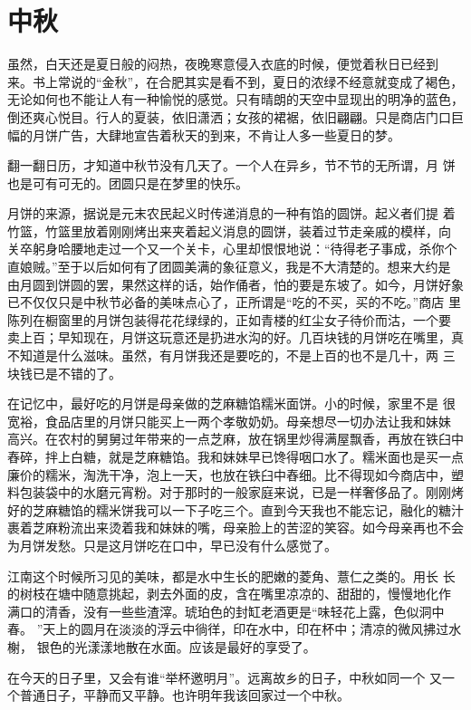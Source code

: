 \section{中秋}

虽然，白天还是夏日般的闷热，夜晚寒意侵入衣底的时候，便觉着秋日已经到 
来。书上常说的“金秋”，在合肥其实是看不到，夏日的浓绿不经意就变成了褐色， 
无论如何也不能让人有一种愉悦的感觉。只有晴朗的天空中显现出的明净的蓝色， 
倒还爽心悦目。行人的夏装，依旧潇洒；女孩的裙裾，依旧翩翩。只是商店门口巨 
幅的月饼广告，大肆地宣告着秋天的到来，不肯让人多一些夏日的梦。 

翻一翻日历，才知道中秋节没有几天了。一个人在异乡，节不节的无所谓，月 
饼也是可有可无的。团圆只是在梦里的快乐。 

月饼的来源，据说是元末农民起义时传递消息的一种有馅的圆饼。起义者们提 
着竹篮，竹篮里放着刚刚烤出来夹着起义消息的圆饼，装着过节走亲戚的模样，向 
关卒躬身哈腰地走过一个又一个关卡，心里却恨恨地说：“待得老子事成，杀你个 
直娘贼。”至于以后如何有了团圆美满的象征意义，我是不大清楚的。想来大约是 
由月圆到饼圆的罢，果然这样的话，始作俑者，怕的要是东坡了。如今，月饼好象 
已不仅仅只是中秋节必备的美味点心了，正所谓是“吃的不买，买的不吃。”商店 
里陈列在橱窗里的月饼包装得花花绿绿的，正如青楼的红尘女子待价而沽，一个要 
卖上百；早知现在，月饼这玩意还是扔进水沟的好。几百块钱的月饼吃在嘴里，真 
不知道是什么滋味。虽然，有月饼我还是要吃的，不是上百的也不是几十，两 
三块钱已是不错的了。
 
在记忆中，最好吃的月饼是母亲做的芝麻糖馅糯米面饼。小的时候，家里不是 
很宽裕，食品店里的月饼只能买上一两个孝敬奶奶。母亲想尽一切办法让我和妹妹 
高兴。在农村的舅舅过年带来的一点芝麻，放在锅里炒得满屋飘香，再放在铁臼中 
舂碎，拌上白糖，就是芝麻糖馅。我和妹妹早已馋得咽口水了。糯米面也是买一点 
廉价的糯米，淘洗干净，泡上一天，也放在铁臼中舂细。比不得现如今商店中，塑 
料包装袋中的水磨元宵粉。对于那时的一般家庭来说，已是一样奢侈品了。刚刚烤 
好的芝麻糖馅的糯米饼我可以一下子吃三个。直到今天我也不能忘记，融化的糖汁 
裹着芝麻粉流出来烫着我和妹妹的嘴，母亲脸上的苦涩的笑容。如今母亲再也不会 
为月饼发愁。只是这月饼吃在口中，早已没有什么感觉了。

江南这个时候所习见的美味，都是水中生长的肥嫩的菱角、薏仁之类的。用长 
长的树枝在塘中随意挑起，剥去外面的皮，含在嘴里凉凉的、甜甜的，慢慢地化作 
满口的清香，没有一些些渣滓。琥珀色的封缸老酒更是“味轻花上露，色似洞中春。 
”天上的圆月在淡淡的浮云中徜徉，印在水中，印在杯中；清凉的微风拂过水榭， 
银色的光漾漾地散在水面。应该是最好的享受了。 

在今天的日子里，又会有谁“举杯邀明月”。远离故乡的日子，中秋如同一个 
又一个普通日子，平静而又平静。也许明年我该回家过一个中秋。 